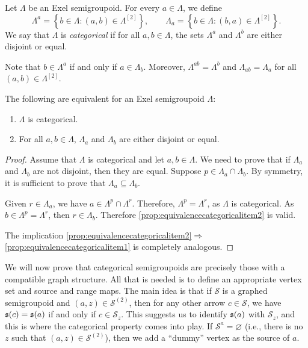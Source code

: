 \begin{definition}[{\cite[Definition 19.1]{MR2419901}}]
Let $\Lambda$ be an Exel semigroupoid. For every $a\in\Lambda$, we define
\[\Lambda^a=\left\{b\in\Lambda:(a,b)\in\Lambda^{[2]}\right\},\qquad\Lambda_a=\left\{b\in\Lambda:(b,a)\in\Lambda^{[2]}\right\}.\]
We say that $\Lambda$ is \emph{categorical} if for all $a,b\in\Lambda$, the sets $\Lambda^a$ and $\Lambda^b$ are either disjoint or equal.
\end{definition}

Note that $b\in\Lambda^a$ if and only if $a\in\Lambda_b$. Moreover, $\Lambda^{ab}=\Lambda^b$ and $\Lambda_{ab}=\Lambda_a$ for all $(a,b)\in\Lambda^{[2]}$.

\begin{proposition}\label{prop:equivalencecategorical}
The following are equivalent for an Exel semigroupoid $\Lambda$:
\begin{enumerate}[label=(\arabic*)]
  \item\label{prop:equivalencecategoricalitem1} $\Lambda$ is categorical.
  \item\label{prop:equivalencecategoricalitem2} For all $a,b\in\Lambda$, $\Lambda_a$ and $\Lambda_b$ are either disjoint or equal.
\end{enumerate}
\end{proposition}
\begin{proof}
  Assume that $\Lambda$ is categorical and let $a,b\in\Lambda$. We need to prove that if $\Lambda_a$ and $\Lambda_b$ are not disjoint, then they are equal. Suppose $p\in\Lambda_a\cap\Lambda_b$. By symmetry, it is sufficient to prove that $\Lambda_a\subseteq\Lambda_b$.
  
  Given $r\in\Lambda_a$, we have $a\in\Lambda^p\cap\Lambda^r$. Therefore, $\Lambda^p=\Lambda^r$, as $\Lambda$ is categorical. As $b\in\Lambda^p=\Lambda^r$, then $r\in\Lambda_b$. Therefore \ref{prop:equivalencecategoricalitem2} is valid.
  
  The implication \ref{prop:equivalencecategoricalitem2}$\Rightarrow$\ref{prop:equivalencecategoricalitem1} is completely analogous.\qedhere
\end{proof}

We will now prove that categorical semigroupoids are precisely those with a compatible graph structure. All that is needed is to define an appropriate vertex set and source and range maps. The main idea is that if $\mathcal{S}$ is a graphed semigroupoid and $(a,z)\in\mathcal{S
    }^{(2)}$, then for any other arrow $c\in\mathcal{S
    }$, we have $\operatorname{\mathfrak{s}}(c)=\operatorname{\mathfrak{s}}(a)$ if and only if $c\in\mathcal{S
    }_z$. This suggests us to identify $\operatorname{\mathfrak{s}}(a)$ with $\mathcal{S
    }_z$, and this is where the categorical property comes into play. If $\mathcal{S
    }^a=\varnothing$ (i.e., there is no $z$ such that $(a,z)\in\mathcal{S
    }^{(2)}$), then we add a ``dummy'' vertex as the source of $a$.


